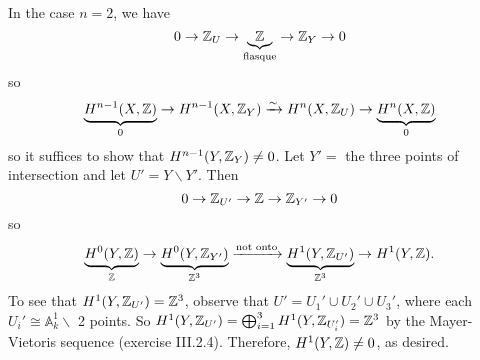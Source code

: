In the case $n=2$, we have
\[
 0\to \mathbb{Z}_U\to \underbrace{\mathbb{Z}}_{\text{flasque}}\to \mathbb{Z}_Y\to 0
\]
 so
\[
    \underbrace{H^{n-1}(X,\mathbb{Z})}_0 \to H^{n-1}(X,\mathbb{Z}_Y)
    \xrightarrow{\sim} H^n(X,\mathbb{Z}_U) \to \underbrace{H^n(X,\mathbb{Z})}_0
\]
so it suffices to show that $H^{n-1}(Y,\mathbb{Z}_Y)\not=0$.  Let $Y'=$
the three points of intersection and let $U'=Y\smallsetminus Y'$.
Then
\[
    0\to \mathbb{Z}_{U'} \to \mathbb{Z} \to \mathbb{Z}_{Y'}\to 0
\]
so
\[
    \underbrace{H^0(Y,\mathbb{Z})}_{\mathbb{Z}} \to
    \underbrace{H^0(Y,\mathbb{Z}_{Y'})}_{\mathbb{Z}^3} \xrightarrow{\text{not
    onto}} \underbrace{H^1(Y,\mathbb{Z}_{U'})}_{\mathbb{Z}^3} \to H^1(Y,\mathbb{Z}).
\]
To see that $H^1(Y,\mathbb{Z}_{U'})=\mathbb{Z}^3$, observe that $U'=U_1'\cup U_2'
\cup U_3'$, where each $U_i'\cong\mathbb{A}^1_k\smallsetminus $ 2
points.  So $H^1(Y,\mathbb{Z}_{U'}) = \bigoplus_{i=1}^3 H^1(Y,\mathbb{Z}_{U_i'}) =
\mathbb{Z}^3$ by the Mayer-Vietoris sequence (exercise III.2.4).
Therefore, $H^1(Y,\mathbb{Z})\not=0$, as desired.
